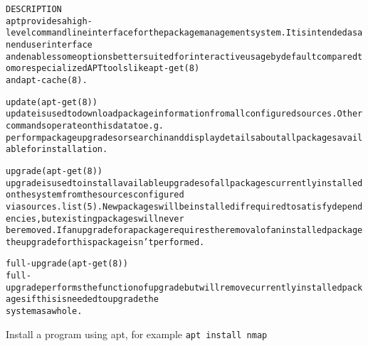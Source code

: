 \documentclass[Screen16to9,17pt]{foils}
\begin{document}
\begin{alltt}\footnotesize
DESCRIPTION
apt provides a high-level commandline interface for the package management system. It is intended as an end user interface
and enables some options better suited for interactive usage by default compared to more specialized APT tools like apt-get(8)
and apt-cache(8).

update (apt-get(8))
  update is used to download package information from all configured sources. Other commands operate on this data to e.g.
  perform package upgrades or search in and display details about all packages available for installation.

upgrade (apt-get(8))
  upgrade is used to install available upgrades of all packages currently installed on the system from the sources configured
  via sources.list(5). New packages will be installed if required to satisfy dependencies, but existing packages will never
  be removed. If an upgrade for a package requires the removal of an installed package the upgrade for this package isn't performed.

full-upgrade (apt-get(8))
  full-upgrade performs the function of upgrade but will remove currently installed packages if this is needed to upgrade the
  system as a whole.
\end{alltt}

\begin{list2}
  \item Install a program using apt, for example \verb+apt install nmap+
\end{list2}








\end{document}
